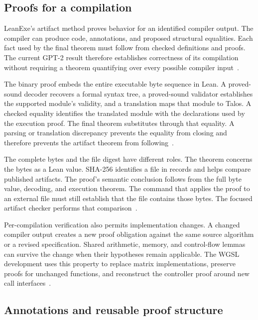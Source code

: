 \subsection{Proofs for a compilation}

LeanExe's artifact method proves behavior for an identified compiler output.  The compiler can produce code, annotations, and proposed structural equalities.  Each fact used by the final theorem must follow from checked definitions and proofs.  The current GPT-2 result therefore establishes correctness of its compilation without requiring a theorem quantifying over every possible compiler input~\cite{artifact,binary}.

The binary proof embeds the entire executable byte sequence in Lean.  A proved-sound decoder recovers a formal syntax tree, a proved-sound validator establishes the supported module's validity, and a translation maps that module to Talos.  A checked equality identifies the translated module with the declarations used by the execution proof.  The final theorem substitutes through that equality.  A parsing or translation discrepancy prevents the equality from closing and therefore prevents the artifact theorem from following~\cite{binary,artifact}.

The complete bytes and the file digest have different roles.  The theorem concerns the bytes as a Lean value.  SHA-256 identifies a file in records and helps compare published artifacts.  The proof's semantic conclusion follows from the full byte value, decoding, and execution theorem.  The command that applies the proof to an external file must still establish that the file contains those bytes.  The focused artifact checker performs that comparison~\cite{artifactgate}.

Per-compilation verification also permits implementation changes.  A changed compiler output creates a new proof obligation against the same source algorithm or a revised specification.  Shared arithmetic, memory, and control-flow lemmas can survive the change when their hypotheses remain applicable.  The WGSL development uses this property to replace matrix implementations, preserve proofs for unchanged functions, and reconstruct the controller proof around new call interfaces~\cite{wg-transport,wg-composition}.

\subsection{Annotations and reusable proof structure}

